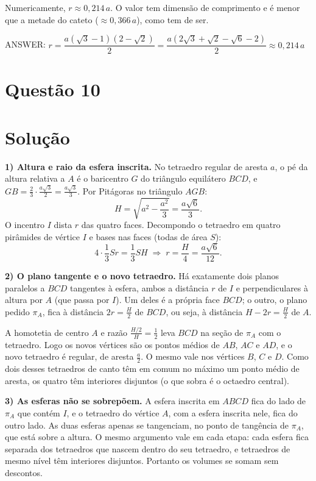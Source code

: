\documentclass{article}%
\begin{document}
Numericamente, $r \approx 0{,}214\,a$. O valor tem dimensão de comprimento e é menor que a metade do cateto ($\approx 0{,}366\,a$), como tem de ser.

ANSWER: $r = \dfrac{a\left(\sqrt{3}-1\right)\left(2-\sqrt{2}\right)}{2} = \dfrac{a\left(2\sqrt{3}+\sqrt{2}-\sqrt{6}-2\right)}{2} \approx 0{,}214\,a$%
\newpage%
\section*{Questão 10}

\section*{Solução}

\textbf{1) Altura e raio da esfera inscrita.} No tetraedro regular de aresta $a$, o pé da altura relativa a $A$ é o baricentro $G$ do triângulo equilátero $BCD$, e $GB=\frac{2}{3}\cdot\frac{a\sqrt3}{2}=\frac{a\sqrt3}{3}$. Por Pitágoras no triângulo $AGB$:
\[
H=\sqrt{a^2-\frac{a^2}{3}}=\frac{a\sqrt6}{3}.
\]
O incentro $I$ dista $r$ das quatro faces. Decompondo o tetraedro em quatro pirâmides de vértice $I$ e bases nas faces (todas de área $S$):
\[
4\cdot\frac{1}{3}Sr=\frac13 SH\;\Longrightarrow\; r=\frac{H}{4}=\frac{a\sqrt6}{12}.
\]

\textbf{2) O plano tangente e o novo tetraedro.} Há exatamente dois planos paralelos a $BCD$ tangentes à esfera, ambos a distância $r$ de $I$ e perpendiculares à altura por $A$ (que passa por $I$). Um deles é a própria face $BCD$; o outro, o plano pedido $\pi_A$, fica à distância $2r=\frac{H}{2}$ de $BCD$, ou seja, à distância $H-2r=\frac{H}{2}$ de $A$.

A homotetia de centro $A$ e razão $\frac{H/2}{H}=\frac12$ leva $BCD$ na seção de $\pi_A$ com o tetraedro. Logo os novos vértices são os pontos médios de $AB$, $AC$ e $AD$, e o novo tetraedro é regular, de aresta $\frac a2$. O mesmo vale nos vértices $B$, $C$ e $D$. Como dois desses tetraedros de canto têm em comum no máximo um ponto médio de aresta, os quatro têm interiores disjuntos (o que sobra é o octaedro central).

\textbf{3) As esferas não se sobrepõem.} A esfera inscrita em $ABCD$ fica do lado de $\pi_A$ que contém $I$, e o tetraedro do vértice $A$, com a esfera inscrita nele, fica do outro lado. As duas esferas apenas se tangenciam, no ponto de tangência de $\pi_A$, que está sobre a altura. O mesmo argumento vale em cada etapa: cada esfera fica separada dos tetraedros que nascem dentro do seu tetraedro, e tetraedros de mesmo nível têm interiores disjuntos. Portanto os volumes se somam sem descontos.
\end{document}
